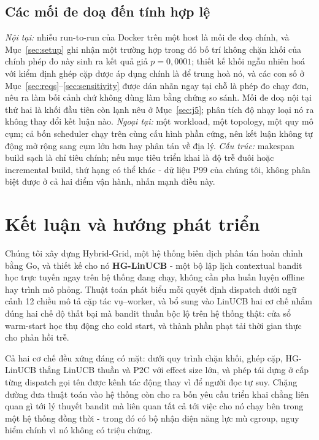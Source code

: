 \documentclass[final,5p,times,twocolumn]{elsarticle}
\begin{document}
\subsection{Các mối đe doạ đến tính hợp lệ}

\emph{Nội tại:} nhiễu run-to-run của Docker trên một host là mối đe doạ chính, và Mục~\ref{sec:setup} ghi nhận một trường hợp trong đó bố trí không chặn khối của chính phép đo này sinh ra kết quả giả $p=0{,}0001$; thiết kế khối ngẫu nhiên hoá với kiểm định ghép cặp được áp dụng chính là để trung hoà nó, và các con số ở Mục~\ref{sec:reqs}--\ref{sec:sensitivity} được dán nhãn ngay tại chỗ là phép đo chạy đơn, nêu ra làm bối cảnh chứ không dùng làm bằng chứng so sánh. Mối đe doạ nội tại thứ hai là khối đầu tiên còn lạnh nêu ở Mục~\ref{sec:j5}; phân tích độ nhạy loại nó ra không thay đổi kết luận nào. \emph{Ngoại tại:} một workload, một topology, một quy mô cụm; cả bốn scheduler chạy trên cùng cấu hình phần cứng, nên kết luận không tự động mở rộng sang cụm lớn hơn hay phân tán về địa lý. \emph{Cấu trúc:} makespan build sạch là chỉ tiêu chính; nếu mục tiêu triển khai là độ trễ đuôi hoặc incremental build, thứ hạng có thể khác - dữ liệu P99 của chúng tôi, không phân biệt được ở cả hai điểm vận hành, nhấn mạnh điều này.

\section{Kết luận và hướng phát triển}
\label{sec:conclusion}

Chúng tôi xây dựng Hybrid-Grid, một hệ thống biên dịch phân tán hoàn chỉnh bằng Go, và thiết kế cho nó \textbf{HG-LinUCB} - một bộ lập lịch contextual bandit học trực tuyến ngay trên hệ thống đang chạy, không cần pha huấn luyện offline hay trình mô phỏng. Thuật toán phát biểu mỗi quyết định dispatch dưới ngữ cảnh 12 chiều mô tả cặp tác vụ--worker, và bổ sung vào LinUCB hai cơ chế nhắm đúng hai chế độ thất bại mà bandit thuần bộc lộ trên hệ thống thật: cửa sổ warm-start học thụ động cho cold start, và thành phần phạt tải thời gian thực cho phản hồi trễ.

Cả hai cơ chế đều xứng đáng có mặt: dưới quy trình chặn khối, ghép cặp, HG-LinUCB thắng LinUCB thuần và P2C với effect size lớn, và phép tái dựng ở cấp từng dispatch gọi tên được kênh tác động thay vì để người đọc tự suy. Chặng đường đưa thuật toán vào hệ thống còn cho ra bốn yêu cầu triển khai chẳng liên quan gì tới lý thuyết bandit mà liên quan tất cả tới việc cho nó chạy bên trong một hệ thống đồng thời - trong đó có bộ nhận diện năng lực mù cgroup, nguy hiểm chính vì nó không có triệu chứng.
\end{document}
